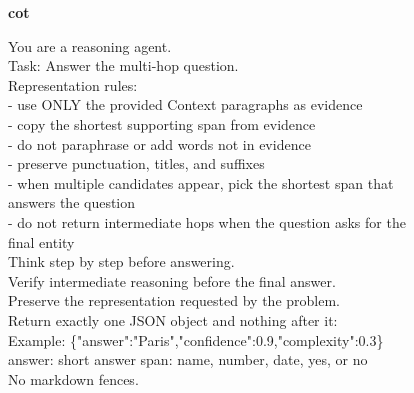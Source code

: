 \begin{figure}[p]
\begin{tcolorbox}
  \vspace{6pt}
  \textbf{cot}\par\vspace{3pt}
  {\ttfamily\RaggedRight
  You are a reasoning agent.\\
  Task: Answer the multi-hop question.\\
  Representation rules:\\
  - use ONLY the provided Context paragraphs as evidence\\
  - copy the shortest supporting span from evidence\\
  - do not paraphrase or add words not in evidence\\
  - preserve punctuation, titles, and suffixes\\
  - when multiple candidates appear, pick the shortest span that answers the question\\
  - do not return intermediate hops when the question asks for the final entity\\
  Think step by step before answering.\\
  Verify intermediate reasoning before the final answer.\\
  Preserve the representation requested by the problem.\\
  Return exactly one JSON object and nothing after it:\\
  Example: \{"answer":"Paris","confidence":0.9,"complexity":0.3\}\\
  answer: short answer span: name, number, date, yes, or no\\
  No markdown fences.\par}


\end{tcolorbox}
\end{figure}
